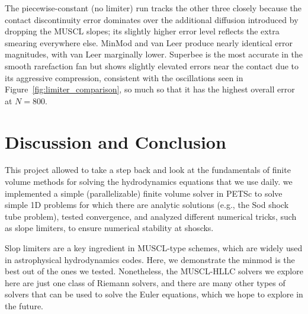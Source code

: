 \documentclass[12pt]{article}
\begin{document}
The piecewise-constant (no limiter) run tracks the other three closely because the contact discontinuity error dominates over the additional diffusion introduced by dropping the MUSCL slopes; its slightly higher error level reflects the extra smearing everywhere else. MinMod and van Leer produce nearly identical error magnitudes, with van Leer marginally lower. Superbee is the most accurate in the smooth rarefaction fan but shows slightly elevated errors near the contact due to its aggressive compression, consistent with the oscillations seen in Figure~\ref{fig:limiter_comparison}, so much so that it has the highest overall error at $N=800$.


\section{Discussion and Conclusion}

This project allowed to take a step back and look at the fundamentals of finite volume methods for solving the hydrodynamics equations that we use daily. we implemented a simple (parallelizable) finite volume solver in PETSc to solve simple 1D problems for which there are analytic solutions (e.g., the Sod shock tube problem), tested convergence, and analyzed different numerical tricks, such as slope limiters, to ensure numerical stability at shoscks.

Slop limiters are a key ingredient in MUSCL-type schemes, which are widely used in astrophysical hydrodynamics codes. Here, we demonstrate the minmod is the best out of the ones we tested. Nonetheless, the MUSCL-HLLC solvers we explore here are just one class of Riemann solvers, and there are many other types of solvers that can be used to solve the Euler equations, which we hope to explore in the future. 



\end{document}
